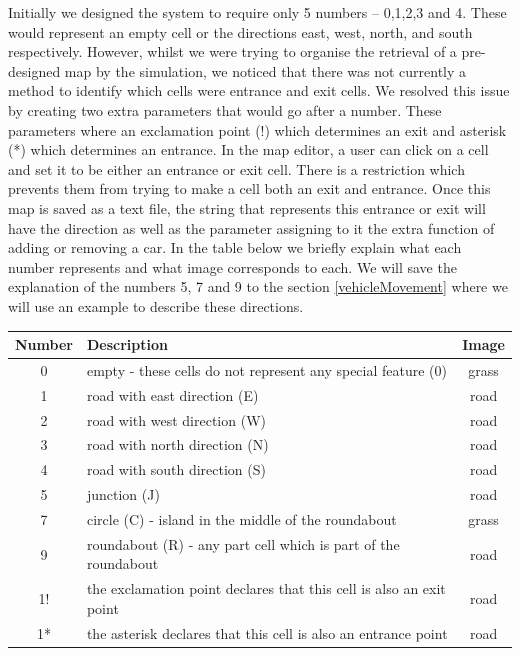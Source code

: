 \documentclass{article}
\begin{document}
Initially we designed the system to require only 5 numbers -- 0,1,2,3 and 4. These would represent an empty cell or the directions east, west, north, and south respectively. However, whilst we were trying to organise the retrieval  of a pre-designed map by the simulation, we noticed that there was not currently a method to identify which cells were entrance and exit cells. We resolved this issue by creating two extra parameters that would go after a number. These parameters where an exclamation point (!) which determines an exit and asterisk (*) which determines an entrance. In the map editor, a user can click on a cell and set it to be either an entrance or exit cell. There is a restriction which prevents them from trying to make a cell both an exit and entrance. Once this map is saved as a text file, the string that represents this entrance or exit will have the direction as well as the parameter assigning to it the extra function of adding or removing a car. In the table below we briefly explain what each number represents and what image corresponds to each. We will save the explanation of the numbers 5, 7 and 9 to the section \ref{vehicleMovement} where we will use an example to describe these directions. 

\vspace{0.5cm}
\begin{center}
	\begin{tabular}{|c|l|c|}
		
		\hline {\bf Number} & {\bf Description} & {\bf Image} \\ 
		\hline 0 & empty - these cells do not represent any special feature (0) & grass \\ 
		\hline 1 & road with east direction (E) & road \\ 
		\hline 2 & road with west direction (W) & road \\ 
		\hline 3 & road with north direction (N) & road \\ 
		\hline 4 & road with south direction (S) & road \\ 
		\hline 5 & junction (J) & road \\ 
		\hline 7 & circle (C) - island in the middle of the roundabout & grass \\ 
		\hline 9 & roundabout (R) - any part cell which is part of the roundabout & road \\ 
		\hline 1! & the exclamation point declares that this cell is also an exit point & road \\
		\hline 1* & the asterisk declares that this cell is also an entrance point & road \\ 
		\hline
	\end{tabular} 
\end{center} 	
\end{document}
